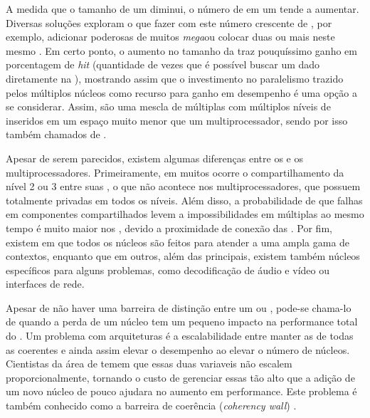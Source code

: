 A medida que o tamanho de um \transistor diminui, o número de \transistors em um \chip tende a aumentar. Diversas soluções exploram o que fazer com este número crescente de \transistors, por exemplo, adicionar \caches poderosas de muitos \textit{mega}\bytes ou colocar duas ou mais \CPUs neste mesmo \chip. Em certo ponto, o aumento no tamanho da \cache traz pouquíssimo ganho em porcentagem de \textit{hit} (quantidade de vezes que é possível buscar um dado diretamente na \cache), mostrando assim que o investimento no paralelismo trazido pelos múltiplos núcleos como recurso para ganho em desempenho é uma opção a se considerar. Assim, \chips \multicore são uma mescla de múltiplas \CPUs com múltiplos níveis de \cache inseridos em um espaço muito menor que um multiprocessador, sendo por isso também chamados de \textit{\CMPs}.

Apesar de serem parecidos, existem algumas diferenças entre os \CMPs e os multiprocessadores. Primeiramente, em muitos \CMPs ocorre o compartilhamento da \cache nível 2 ou 3 entre suas \CPUs, o que não acontece nos multiprocessadores, que possuem \caches totalmente privadas em todos os níveis. Além disso, a probabilidade de que falhas em componentes compartilhados levem a impossibilidades em múltiplas \CPUs ao mesmo tempo é muito maior nos \CMPs, devido a proximidade de conexão das \CPUs. Por fim, existem \chips \multicore em que todos os núcleos são feitos para atender a uma ampla gama de contextos, enquanto que em outros, além das \CPUs principais, existem também núcleos específicos para alguns problemas, como decodificação de áudio e vídeo ou interfaces de rede. 

Apesar de não haver uma barreira de distinção entre um \chip \manycore ou \multicore, pode-se chama-lo de \manycore quando a perda de um núcleo tem um pequeno impacto na performance total do \chip. Um problema com arquiteturas \manycore é a escalabilidade entre manter as \caches de todas as \CPUs coerentes e ainda assim elevar o desempenho ao elevar o número de núcleos. Cientistas da área de \HPC temem que essas duas variaveis não escalem proporcionalmente, tornando o custo de gerenciar essas \caches tão alto que a adição de um novo núcleo de pouco ajudara no aumento em performance. Este problema é também conhecido como a barreira de coerência  (\textit{coherency wall}) \cite{TanenbaumMordenOS}.


